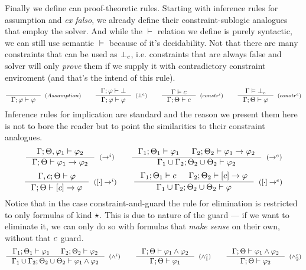 \documentclass[english, mgr]{iithesis}
\begin{document}
Finally we define can proof-theoretic rules. Starting with inference rules for
assumption and \textit{ex falso}, we already define their constraint-sublogic analogues
that employ the solver.
And while the $\vdash$ relation we define is purely syntactic,
we can still use semantic $\vDash$ because of it's decidability.
Not that there are many constraints that can be used as $\bot_c$, i.e.
constraints that are always false and solver will only \textit{prove} them
if we supply it with contradictory constraint enviroment (and that's the intend of this rule).
\begin{eqnarray*}
  \inference{
  }{
    \jgmnt[\cEnv;\formphi]{\formphi}
  }[(\ensuremath{Assumption})]
  \qquad
  \inference{
    \jgmnt[\cEnv;\formphi]{\bot}
  }{
    \jgmnt[\cEnv;\formphi]{\formphi}
  }[(\ensuremath{\bot^e})]
  \qquad
  \inference{
    \cjgmnt[\cEnv]{\constr}
  }{
    \jgmnt[\cEnv;\Theta]{\constr}
  }[(\ensuremath{constr^i})]
  \qquad
  \inference{
    \cjgmnt[\cEnv]{\bot_\constr}
    }{
    \jgmnt[\cEnv;\Theta]{\formphi}
  }[(\ensuremath{constr^e})]
\end{eqnarray*}
Inference rules for implication are standard and the reason we present them here
is not to bore the reader but to point the similarities to their constraint analogues.
\begin{eqnarray*}
  \inference{
    \jgmnt[\cEnv;\Theta,\formphi_1]{\formphi_2}
  }{
    \jgmnt[\cEnv;\Theta]{\formphi_1 \fImp \formphi_2}
  }[(\ensuremath{\fImp^i})]
  \qquad
  \inference{
    \jgmnt[\cEnv_1;\Theta_1]{\formphi_1} &
    \jgmnt[\cEnv_2;\Theta_2]{\formphi_1 \fImp \formphi_2}
    }{
    \jgmnt[\cEnv_1 \cup \cEnv_2;\Theta_2 \cup \Theta_2]{\formphi_2}
  }[(\ensuremath{\fImp^e})]
\end{eqnarray*}
\begin{eqnarray*}
  \inference{
    \jgmnt[\cEnv, \constr;\Theta]{\formphi}
  }{
    \jgmnt[\cEnv;\Theta]{\fCImp{\constr}\formphi}
  }[(\ensuremath{\fCImp{\cdot}^i})]
  \qquad
  \inference{
    \jgmnt[\cEnv_1;\Theta_1]{\constr} &
    \jgmnt[\cEnv_2;\Theta_2]{\fCImp{\constr}\formphi}
    }{
    \jgmnt[\cEnv_1 \cup \cEnv_2;\Theta_2 \cup \Theta_2]{\formphi}
  }[(\ensuremath{\fCImp{\cdot}^e})]
\end{eqnarray*}
Notice that in the case constraint-and-guard the rule for elimination is restricted
to only formulas of kind $\star$.
This is due to nature of the guard --- if we want to eliminate it,
we can only do so with formulas that \textit{make sense} on their own,
without that $c$ guard.
\begin{eqnarray*}
  \inference{
    \jgmnt[\cEnv_1;\Theta_1]{\formphi_1} &
    \jgmnt[\cEnv_2;\Theta_2]{\formphi_2}
  }{
    \jgmnt[\cEnv_1 \cup \cEnv_2;\Theta_2 \cup \Theta_2]{\formphi_1 \wedge \formphi_2}
  }[(\ensuremath{\wedge^i})]
  \qquad
  \inference{
    \jgmnt[\cEnv;\Theta]{\formphi_1 \wedge \formphi_2}
    }{
    \jgmnt[\cEnv;\Theta]{\formphi_1}
  }[(\ensuremath{\wedge^e_1})]\qquad
  \inference{
    \jgmnt[\cEnv;\Theta]{\formphi_1 \wedge \formphi_2}
    }{
    \jgmnt[\cEnv;\Theta]{\formphi_2}
  }[(\ensuremath{\wedge^e_2})]
\end{eqnarray*}
\end{document}
